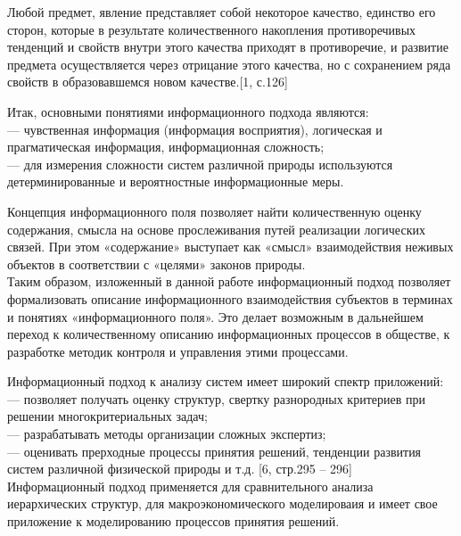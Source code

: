 \documentclass[a4paper,12pt]{report}
\begin{document}
Любой предмет, явление представляет собой некоторое качество, единство его сторон, которые в результате количественного накопления противоречивых тенденций и свойств внутри этого качества приходят в противоречие, и развитие предмета осуществляется через отрицание этого качества, но с сохранением ряда свойств в образовавшемся новом качестве.[1, с.126]

Итак, основными понятиями информационного подхода являются:\\
\hspace*{0.7cm} — чувственная информация (информация восприятия), логическая и прагматическая информация, информационная сложность;\\
\hspace*{0.7cm} — для измерения сложности систем различной природы используются детерминированные и вероятностные информационные меры.

Концепция информационного поля позволяет найти количественную оценку содержания, смысла на основе прослеживания путей реализации логических связей. При этом «содержание» выступает как «смысл» взаимодействия неживых объектов в соответствии с «целями» законов природы.\\
Таким образом, изложенный в данной работе информационный подход позволяет формализовать описание информационного взаимодействия субъектов в терминах и понятиях «информационного поля». Это делает возможным в дальнейшем переход к количественному описанию информационных процессов в обществе, к разработке методик контроля и управления этими процессами.

 Информационный подход к анализу систем имеет широкий спектр приложений:\\
\hspace*{0.7cm}—  позволяет получать оценку структур, свертку разнородных критериев при решении многокритериальных задач;\\
\hspace*{0.7cm}—  разрабатывать методы организации сложных экспертиз;\\
\hspace*{0.7cm}—  оценивать прерходные процессы принятия решений, тенденции развития систем различной физической природы и т.д. [6, стр.295 – 296]\\ Информационный подход применяется для сравнительного анализа иерархических структур, для макроэкономического моделироваия и  имеет свое приложение к моделированию процессов принятия решений.
\end{document}
